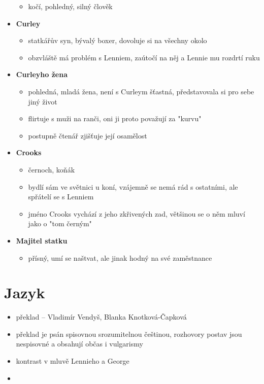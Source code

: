 \documentclass[10pt,a4paper]{article}
\begin{document}
\begin{itemize}
\begin{itemize}
	\item kočí, pohledný, silný člověk
	\end{itemize}
\item \textbf{Curley}
	\begin{itemize}
	\item statkářův syn, bývalý boxer, dovoluje si na všechny okolo
	\item obzvláště má problém s Lenniem, zaútočí na něj a Lennie mu rozdrtí ruku
	\end{itemize}
\item \textbf{Curleyho žena}
	\begin{itemize}
	\item pohledná, mladá žena, není s Curleym šťastná, představovala si pro sebe jiný život
	\item flirtuje s muži na ranči, oni ji proto považují za "kurvu"
	\item postupně čtenář zjišťuje její osamělost
	\end{itemize}
\item \textbf{Crooks}
	\begin{itemize}
	\item černoch, koňák
	\item bydlí sám ve světnici u koní, vzájemně se nemá rád s ostatními, ale spřátelí se s Lenniem
	\item jméno Crooks vychází z jeho zkřivených zad, většinou se o něm mluví jako o "tom černým"
	\end{itemize}
\item \textbf{Majitel statku}
	\begin{itemize}
	\item přísný, umí se naštvat, ale jinak hodný na své zaměstnance
	\end{itemize}

\end{itemize}
\section*{Jazyk}
\begin{itemize}
\item překlad -- Vladimír Vendyš, Blanka Knotková-Čapková
\item překlad je psán spisovnou srozumitelnou češtinou, rozhovory postav jsou nespisovné a obsahují občas i vulgarismy
\item kontrast v mluvě Lennieho a George
\item 
\end{itemize}
\end{document}
